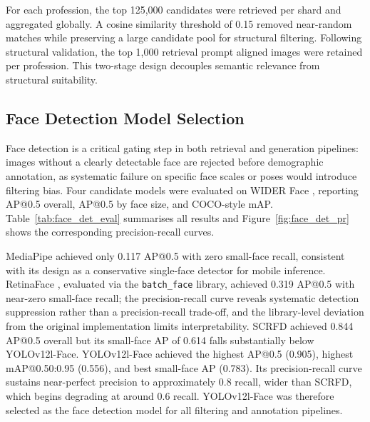 For each profession, the top 125,000 candidates were retrieved per shard and aggregated globally. A cosine similarity threshold of 0.15 removed near-random matches while preserving a large candidate pool for structural filtering. Following structural validation, the top 1,000 retrieval prompt aligned images were retained per profession. This two-stage design decouples semantic relevance from structural suitability.

\subsection{Face Detection Model Selection}
\label{subsec:face_detection_selection}

Face detection is a critical gating step in both retrieval and generation pipelines: images without a clearly detectable face are rejected before demographic annotation, as systematic failure on specific face scales or poses would introduce filtering bias. Four candidate models were evaluated on WIDER Face \cite{Yang_2016_WIDERFace}, reporting AP@0.5 overall, AP@0.5 by face size, and COCO-style mAP. Table~\ref{tab:face_det_eval} summarises all results and Figure~\ref{fig:face_det_pr} shows the corresponding precision-recall curves.

MediaPipe \cite{Lugaresi_2019_MediaPipe} achieved only 0.117 AP@0.5 with zero small-face recall, consistent with its design as a conservative single-face detector for mobile inference. RetinaFace \cite{Deng_2020_RetinaFace}, evaluated via the \texttt{batch\_face} library, achieved 0.319 AP@0.5 with near-zero small-face recall; the precision-recall curve reveals systematic detection suppression rather than a precision-recall trade-off, and the library-level deviation from the original implementation limits interpretability. SCRFD \cite{Guo_2021_SCRFD} achieved 0.844 AP@0.5 overall but its small-face AP of 0.614 falls substantially below YOLOv12l-Face. YOLOv12l-Face achieved the highest AP@0.5 (0.905), highest mAP@0.50:0.95 (0.556), and best small-face AP (0.783). Its precision-recall curve sustains near-perfect precision to approximately 0.8 recall, wider than SCRFD, which begins degrading at around 0.6 recall. YOLOv12l-Face was therefore selected as the face detection model for all filtering and annotation pipelines.

